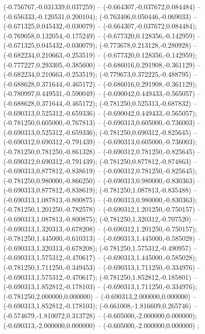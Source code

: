  (-0.756767,-0.031339,0.037259) -- (-0.664307,-0.037672,0.084484) -- (-0.656333,-0.120531,0.200104);
 (-0.763406,0.050446,-0.069033) -- (-0.671325,0.045432,-0.030079) -- (-0.664307,-0.037672,0.084484);
 (-0.769058,0.132054,-0.175249) -- (-0.677320,0.128356,-0.142959) -- (-0.671325,0.045432,-0.030079);
 (-0.773678,0.213128,-0.280928) -- (-0.682234,0.210663,-0.253519) -- (-0.677320,0.128356,-0.142959);
 (-0.777227,0.293305,-0.385600) -- (-0.686016,0.291908,-0.361129) -- (-0.682234,0.210663,-0.253519);
 (-0.779673,0.372225,-0.488795) -- (-0.688628,0.371644,-0.465172) -- (-0.686016,0.291908,-0.361129);
 (-0.780997,0.449531,-0.590049) -- (-0.690042,0.449433,-0.565057) -- (-0.688628,0.371644,-0.465172);
 (-0.781250,0.525313,-0.687832) -- (-0.690313,0.525312,-0.659336) -- (-0.690042,0.449433,-0.565057);
 (-0.781250,0.605000,-0.767813) -- (-0.690313,0.605000,-0.736003) -- (-0.690313,0.525312,-0.659336);
 (-0.781250,0.690312,-0.825645) -- (-0.690312,0.690312,-0.791439) -- (-0.690313,0.605000,-0.736003);
 (-0.781250,0.781250,-0.861328) -- (-0.690312,0.781250,-0.825645) -- (-0.690312,0.690312,-0.791439);
 (-0.781250,0.877812,-0.874863) -- (-0.690313,0.877812,-0.838619) -- (-0.690312,0.781250,-0.825645);
 (-0.781250,0.980000,-0.866250) -- (-0.690313,0.980000,-0.830363) -- (-0.690313,0.877812,-0.838619);
 (-0.781250,1.087813,-0.835488) -- (-0.690313,1.087813,-0.800875) -- (-0.690313,0.980000,-0.830363);
 (-0.781250,1.201250,-0.782578) -- (-0.690312,1.201250,-0.750157) -- (-0.690313,1.087813,-0.800875);
 (-0.781250,1.320312,-0.707520) -- (-0.690313,1.320313,-0.678208) -- (-0.690312,1.201250,-0.750157);
 (-0.781250,1.445000,-0.610313) -- (-0.690313,1.445000,-0.585028) -- (-0.690313,1.320313,-0.678208);
 (-0.781250,1.575312,-0.490957) -- (-0.690313,1.575312,-0.470617) -- (-0.690313,1.445000,-0.585028);
 (-0.781250,1.711250,-0.349453) -- (-0.690313,1.711250,-0.334976) -- (-0.690313,1.575312,-0.470617);
 (-0.781250,1.852812,-0.185801) -- (-0.690313,1.852812,-0.178103) -- (-0.690313,1.711250,-0.334976);
 (-0.781250,2.000000,0.000000) -- (-0.690313,2.000000,0.000000) -- (-0.690313,1.852812,-0.178103);
 (-0.661008,-1.816609,0.265746) -- (-0.574679,-1.810072,0.313728) -- (-0.605000,-2.000000,0.000000);
 (-0.690313,-2.000000,0.000000) -- (-0.605000,-2.000000,0.000000) ;

